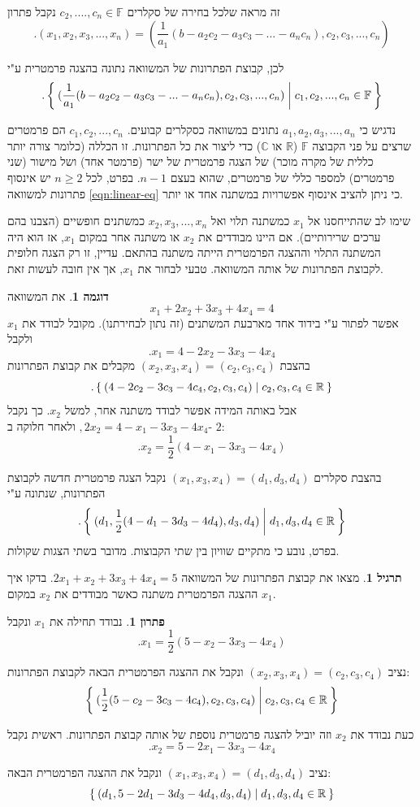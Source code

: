 \documentclass[12pt]{report}
\theoremstyle{plain}
\theoremstyle{definition}
\newtheorem{example}{דוגמה}[chapter]
\newtheorem{exercise}{תרגיל}[chapter]
\newtheorem*{solution}{פתרון}
\newcommand{\R}{\mathbb{R}}
\newcommand{\C}{\mathbb{C}}
\newcommand{\F}{\mathbb{F}}
\newcommand{\0}{\mathbf{0}}
\begin{document}
זה מראה שלכל בחירה של סקלרים $c_2,....,c_n\in\F$
נקבל פתרון
$$
.(x_1,x_2,x_3,...,x_n)=(\frac{1}{a_1}(b-a_2c_2-a_3c_3-...-a_nc_n),c_2,c_3,...,c_n)
$$

לכן, קבוצת הפתרונות של המשוואה נתונה בהצגה פרמטרית ע"י
$$
.\Set{(\frac{1}{a_1}(b-a_2c_2-a_3c_3-...-a_nc_n),c_2,c_3,...,c_n)|c_1,c_2,...,c_n\in\F}
$$

נדגיש כי
$a_1,a_2,a_3,...,a_n$
 נתונים במשוואה כסקלרים קבועים.
 $c_1,c_2,...,c_n$
 הם פרמטרים שרצים על פני הקבוצה
$\F$ 
($\R$ או $\C$)
כדי ליצור
את כל הפתרונות. זו הכללה (כלומר צורה יותר כללית של מקרה מוכר) של הצגה פרמטרית של ישר (פרמטר אחד) ושל מישור
(שני פרמטרים) למספר כללי של פרמטרים, שהוא בעצם
$n-1$.
בפרט, לכל
$n\geq2$
יש אינסוף פתרונות למשוואה 
\ref{eqn:linear-eq}
כי ניתן להציב אינסוף אפשרויות במשתנה אחד או יותר.

שימו לב שהתייחסנו אל $x_1$ כמשתנה תלוי ואל $x_2,x_3,...,x_n$
כמשתנים חופשיים (הצבנו בהם ערכים שרירותיים). אם היינו מבודדים את
$x_2$
או משתנה אחר במקום $x_1$,
אז הוא היה המשתנה התלוי וההצגה הפרמטרית הייתה משתנה בהתאם. עדיין, זו רק הצגה חלופית לקבוצת הפתרונות  של אותה המשוואה. טבעי לבחור את
$x_1$,
אך אין חובה לעשות זאת.

\begin{example}
את המשוואה 
$$x_1+2x_2+3x_3+4x_4=4$$
אפשר לפתור ע"י בידוד אחד מארבעת המשתנים (זה נתון לבחירתנו). מקובל לבודד את 
$x_1$
ולקבל
$$.x_1=4-2x_2-3x_3-4x_4$$
בהצבת 
$(x_2,x_3,x_4)=(c_2,c_3,c_4)$
מקבלים את קבוצת הפתרונות
$$
.\Set{(4-2c_2-3c_3-4c_4,c_2,c_3,c_4)|c_2,c_3,c_4\in\R}
$$
אבל באותה המידה אפשר לבודד משתנה אחר, למשל 
$x_2$.
כך נקבל
$,2x_2=4-x_1-3x_3-4x_4$
ולאחר חלוקה ב-
$2$:
$$.x_2=\frac{1}{2}(4-x_1-3x_3-4x_4)$$

בהצבת סקלרים 
$(x_1,x_3,x_4)=(d_1,d_3,d_4)$
נקבל הצגה פרמטרית חדשה לקבוצת הפתרונות, שנתונה ע"י
$$
.\Set{(d_1,\frac{1}{2}(4-d_1-3d_3-4d_4),d_3,d_4)|d_1,d_3,d_4\in\R}
$$
בפרט, נובע כי מתקיים שוויון בין שתי הקבוצות. מדובר בשתי הצגות שקולות.
\end{example}

\begin{exercise}
מצאו את קבוצת הפתרונות של המשוואה
$2x_1+x_2+3x_3+4x_4=5$.
בדקו איך ההצגה הפרמטרית משתנה כאשר מבודדים את
$x_2$
במקום $x_1$.
\end{exercise}

\begin{solution}
נבודד תחילה את 
$x_1$
ונקבל
$$
.x_1=\frac{1}{2}(5-x_2-3x_3-4x_4)
$$

נציב
$(x_2,x_3,x_4)=(c_2,c_3,c_4)$ 
ונקבל את ההצגה הפרמטרית הבאה לקבוצת הפתרונות:
$$
\Set{(\frac{1}{2}(5-c_2-3c_3-4c_4),c_2,c_3,c_4)|c_2,c_3,c_4\in\R}
$$

כעת נבודד את
$x_2$
וזה יוביל להצגה פרמטרית נוספת של אותה קבוצת הפתרונות. ראשית נקבל
$$
.x_2=5-2x_1-3x_3-4x_4
$$

נציב
$(x_1,x_3,x_4)=(d_1,d_3,d_4)$
ונקבל את ההצגה הפרמטרית הבאה: 
$$
\Set{(d_1,5-2d_1-3d_3-4d_4,d_3,d_4)|d_1,d_3,d_4\in\R}
$$

\end{solution}
\end{document}
